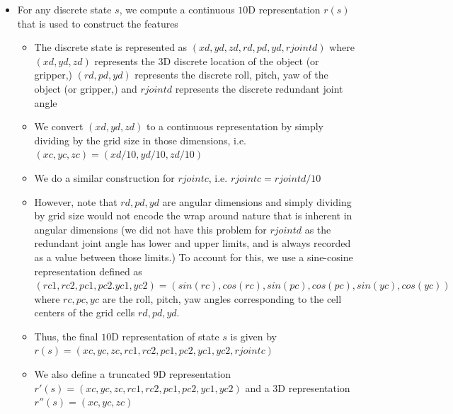 \begin{itemize}
	\item For any discrete state $s$, we compute a continuous
          $10$D representation $r(s)$ that is used to construct the
          features

	\begin{itemize}
		\item The discrete state is represented as $(xd, yd,
                  zd, rd, pd, yd, rjointd)$ where $(xd, yd, zd)$
                  represents the $3$D discrete location of the object
                  (or gripper,) $(rd, pd, yd)$ represents the discrete
                  roll, pitch, yaw of the object (or gripper,) and
                  $rjointd$ represents the discrete redundant joint
                  angle

		\item We convert $(xd, yd, zd)$ to a continuous
                  representation by simply dividing by the grid size
                  in those dimensions, i.e. $(xc, yc, zc) = (xd/10,
                  yd/10, zd/10)$

		\item We do a similar construction for $rjointc$,
                  i.e. $rjointc = rjointd/10$

		\item However, note that $rd, pd, yd$ are angular
                  dimensions and simply dividing by grid size would
                  not encode the wrap around nature that is inherent
                  in angular dimensions (we did not have this problem
                  for $rjointd$ as the redundant joint angle has lower
                  and upper limits, and is always recorded as a value
                  between those limits.) To account for this, we use a
                  sine-cosine representation defined as $(rc1, rc2,
                  pc1, pc2. yc1, yc2) = (sin(rc), cos(rc), sin(pc),
                  cos(pc), sin(yc), cos(yc))$ where $rc, pc, yc$ are
                  the roll, pitch, yaw angles corresponding to the
                  cell centers of the grid cells $rd, pd, yd$.

		\item Thus, the final $10$D representation of state
                  $s$ is given by $r(s) = (xc, yc, zc, rc1, rc2, pc1,
                  pc2, yc1, yc2, rjointc)$

		\item We also define a truncated $9$D representation
                  $r'(s) = (xc, yc, zc, rc1, rc2, pc1, pc2, yc1, yc2)$
                  and a $3$D representation $r''(s) = (xc, yc, zc)$


\end{itemize}
\end{itemize}
